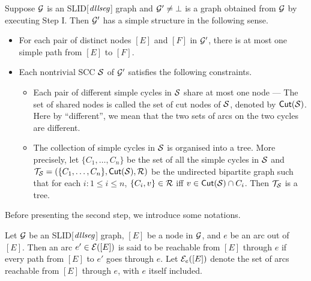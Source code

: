 \documentclass{llncs}
\newcommand\cutn{\mathsf{Cut}}
\begin{document}
\begin{proposition}\label{prop-unique-path}
Suppose $\mathcal{G}$ is an SLID[$\mathit{dllseg}$] graph and $\mathcal{G}' \neq \bot$ is a graph obtained from $\mathcal{G}$ by executing Step I. Then $\mathcal{G}'$ has a simple structure in the following sense.
\begin{itemize}
\item For each pair of distinct nodes $[E]$ and $[F]$ in $\mathcal{G}'$, there is at most one simple path from $[E]$ to $[F]$.
%
\item Each nontrivial SCC $\mathcal{S}$ of $\mathcal{G}'$ satisfies the following constraints.
\begin{itemize}
\item Each pair of different simple cycles in $\mathcal{S}$ share at most one node --- The set of shared nodes is called the set of cut nodes of $\mathcal{S}$, denoted by $\cutn(\Ss)$. Here by ``different'', we mean that the two sets of arcs on the two cycles are different.
\item
The collection of simple cycles in $\mathcal{S}$ is organised into a tree. More precisely, let $\{C_1,\dots,C_n\}$ be the set of all the simple cycles in $\mathcal{S}$ and $\Tt_\Ss=(\{C_1,\dots,C_n\}, \cutn(\Ss), \Rr)$ be the undirected bipartite  graph such that for each $i: 1 \le i \le n$, $\{C_i, v\} \in \mathcal{R}$ iff $v \in \cutn(\Ss) \cap C_i$. Then $\mathcal{T}_{\mathcal{S}}$ is a tree.
\end{itemize}
\end{itemize}
\end{proposition}

Before presenting the second step, we introduce some notations.

\begin{definition}
Let $\mathcal{G}$ be an SLID[$\mathit{dllseg}$] graph, $[E]$ be a node in $\mathcal{G}$, and $e$ be an arc out of $[E]$. Then an arc $e' \in \mathcal{E}([E])$ is said to be reachable from $[E]$ through $e$ if every path from $[E]$ to $e'$ goes through $e$. Let $\mathcal{E}_{e}([E])$ denote the set of arcs reachable from $[E]$ through $e$, with $e$ itself included. 
\end{definition}
\end{document}
